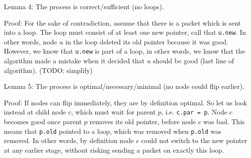 Lemma 4: The process is correct/sufficient (no loops).

Proof: For the sake of contradiction, assume that there is a packet which is sent into a loop. The loop must consist of at least one new pointer, call that \texttt{u.new}. In other words, node $u$ in the loop deleted its old pointer because it was good. However, we know that \texttt{u.new} is part of a loop, in other words, we know that the algorithm made a mistake when it decided that $u$ should be good (last line of algorithm). (TODO: simplify)

Lemma 5: The process is optimal/necessary/minimal (no node could flip earlier).

Proof: If nodes can flip immediately, they are by definition optimal. So let us look instead at child node $c$, which must wait for parent $p$, i.e. \texttt{c.par = p}. Node $c$ becomes good once parent $p$ removes its old pointer, before node $c$ was bad. This means that \texttt{p.old} pointed to a loop, which was removed when \texttt{p.old} was removed. In other words, by definition node $c$ could not switch to the new pointer at any earlier stage, without risking sending a packet on exactly this loop.




